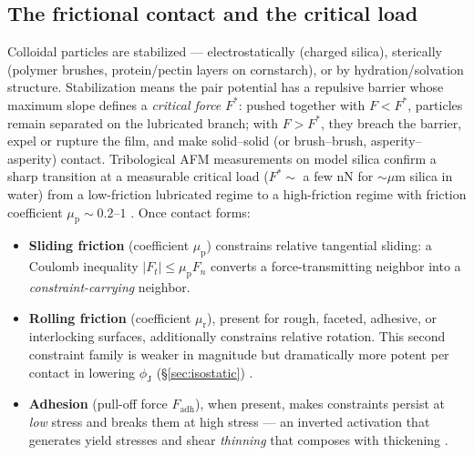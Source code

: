 \documentclass[11pt]{article}
\newcommand{\phiJ}{\phi_{\mathrm{J}}}
\newcommand{\Fstar}{F^{*}}
\newcommand{\mup}{\mu_{\mathrm{p}}}
\begin{document}
\subsection{The frictional contact and the critical load}
\label{sec:criticalload}
Colloidal particles are stabilized --- electrostatically (charged silica), sterically (polymer brushes, protein/pectin layers on cornstarch), or by hydration/solvation structure. Stabilization means the pair potential has a repulsive barrier whose maximum slope defines a \emph{critical force} $\Fstar$: pushed together with $F < \Fstar$, particles remain separated on the lubricated branch; with $F > \Fstar$, they breach the barrier, expel or rupture the film, and make solid--solid (or brush--brush, asperity--asperity) contact. Tribological AFM measurements on model silica confirm a sharp transition at a measurable critical load ($\Fstar \sim$ a few nN for $\sim\mu$m silica in water) from a low-friction lubricated regime to a high-friction regime with friction coefficient $\mup \sim 0.2$--$1$ \cite{comtet2017}. Once contact forms:

\begin{itemize}
\item \textbf{Sliding friction} (coefficient $\mup$) constrains relative tangential sliding: a Coulomb inequality $|F_t| \le \mup F_n$ converts a force-transmitting neighbor into a \emph{constraint-carrying} neighbor.
\item \textbf{Rolling friction} (coefficient $\mu_{\mathrm{r}}$), present for rough, faceted, adhesive, or interlocking surfaces, additionally constrains relative rotation. This second constraint family is weaker in magnitude but dramatically more potent per contact in lowering $\phiJ$ (\S\ref{sec:isostatic}) \cite{singh2020}.
\item \textbf{Adhesion} (pull-off force $F_{\mathrm{adh}}$), when present, makes constraints persist at \emph{low} stress and breaks them at high stress --- an inverted activation that generates yield stresses and shear \emph{thinning} that composes with thickening \cite{richards2020,guy2018}.
\end{itemize}
\end{document}
